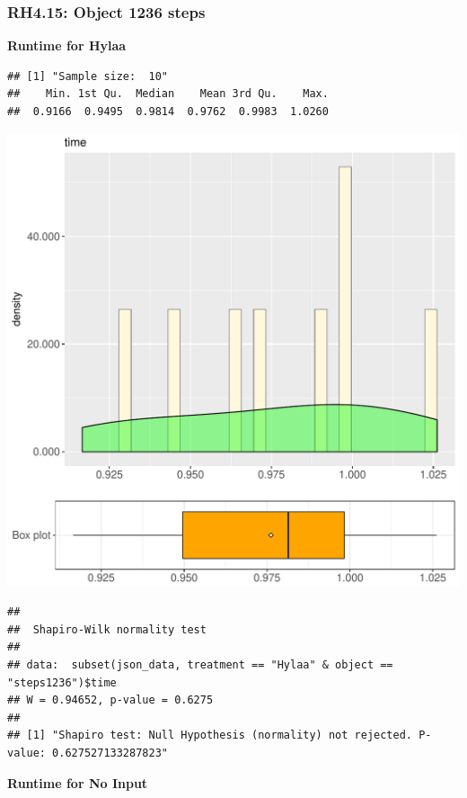 \documentclass{article}\usepackage[]{graphicx}\usepackage[]{color}
\makeatletter
\def\maxwidth{ %
  \ifdim\Gin@nat@width>\linewidth
    \linewidth
  \else
    \Gin@nat@width
  \fi
}
\newenvironment{kframe}{%
 \def\at@end@of@kframe{}%
 \ifinner\ifhmode%
  \def\at@end@of@kframe{\end{minipage}}%
  \begin{minipage}{\columnwidth}%
 \fi\fi%
 \def\FrameCommand##1{\hskip\@totalleftmargin \hskip-\fboxsep
 \colorbox{shadecolor}{##1}\hskip-\fboxsep
     \hskip-\linewidth \hskip-\@totalleftmargin \hskip\columnwidth}%
 \MakeFramed {\advance\hsize-\width
   \@totalleftmargin\z@ \linewidth\hsize
   \@setminipage}}%
 {\par\unskip\endMakeFramed%
 \at@end@of@kframe}
\newenvironment{knitrout}{}{} %
\makeatother
\begin{document}
\subsubsection{RH4.15: Object 1236 steps}

 \textbf{Runtime for Hylaa}
\begin{knitrout}
\color{fgcolor}\begin{kframe}
\begin{verbatim}
## [1] "Sample size:  10"
##    Min. 1st Qu.  Median    Mean 3rd Qu.    Max. 
##  0.9166  0.9495  0.9814  0.9762  0.9983  1.0260
\end{verbatim}
\end{kframe}
\includegraphics[width=\maxwidth]{figure/RH4_Hylaa_steps1236-1} 
\begin{kframe}\begin{verbatim}
## 
## 	Shapiro-Wilk normality test
## 
## data:  subset(json_data, treatment == "Hylaa" & object == "steps1236")$time
## W = 0.94652, p-value = 0.6275
## 
## [1] "Shapiro test: Null Hypothesis (normality) not rejected. P-value: 0.627527133287823"
\end{verbatim}
\end{kframe}
\end{knitrout}
 \textbf{Runtime for No Input}
\end{document}
